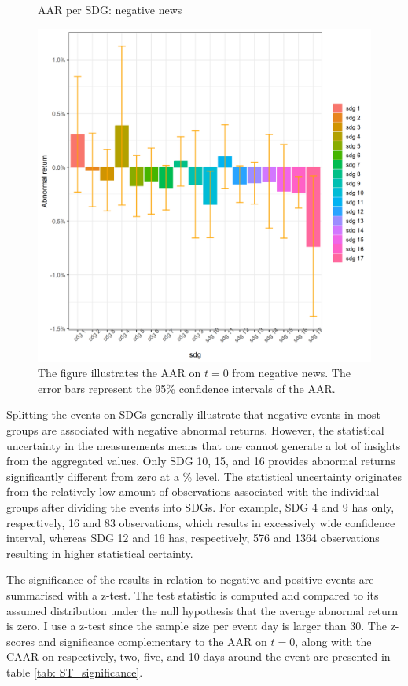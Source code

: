 \begin{figure} [H]
    \centering
    \caption{AAR per SDG: negative news}
    \includegraphics[scale=0.6]{Projekt/1.Figures analysis/ST_negative_sdg_bar.png}
    \caption*{\footnotesize The figure illustrates the AAR on $t = 0$ from negative news. The error bars represent the 95\% confidence intervals of the AAR.}
    \label{fig:ST_neg_bar}
\end{figure}

Splitting the events on SDGs generally illustrate that negative events in most groups are associated with negative abnormal returns. However, the statistical uncertainty in the measurements means that one cannot generate a lot of insights from the aggregated values. Only SDG 10, 15, and 16 provides abnormal returns significantly different from zero at a \% level. The statistical uncertainty originates from the relatively low amount of observations associated with the individual groups after dividing the events into SDGs. For example, SDG 4 and 9 has only, respectively, 16 and 83 observations, which results in excessively wide confidence interval, whereas SDG 12 and 16 has, respectively, 576 and 1364 observations resulting in higher statistical certainty.   

The significance of the results in relation to negative and positive events are summarised with a z-test. The test statistic is computed and compared to its assumed distribution under the null hypothesis that the average abnormal return is zero. I use a z-test since the sample size per event day is larger than 30. The z-scores and significance complementary to the AAR on $t=0$, along with the CAAR on respectively, two, five, and 10 days around the event are presented in table \ref{tab: ST_significance}.   

